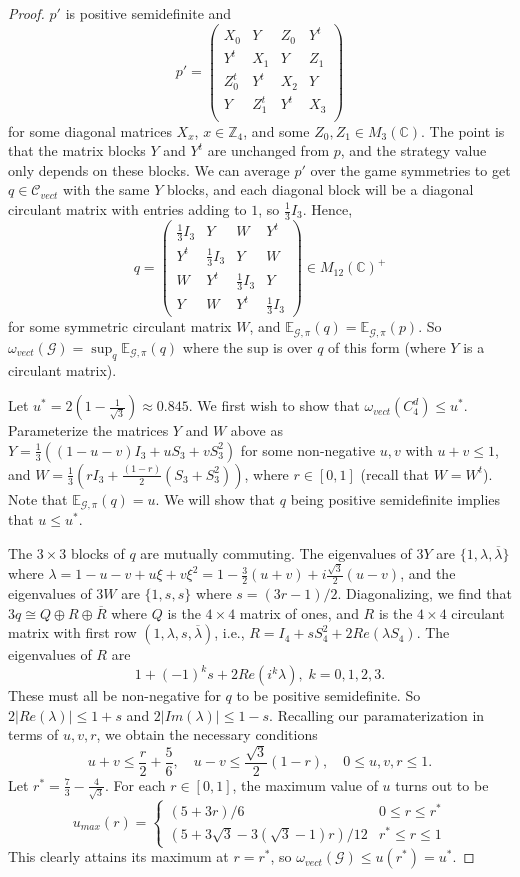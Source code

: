 \documentclass[11pt]{amsart}
\theoremstyle{definition}
\newcommand{\bb}[1]{\mathbb{#1}}
\newcommand{\cl}[1]{\mathcal{#1}}
\begin{document}
\begin{proof}
  $p'$ is positive semidefinite and
  \[ p'
    =
    \begin{pmatrix}
      X_0&Y&Z_0&Y^t\\
      Y^t&X_1&Y&Z_1\\
      Z_0^t&Y^t&X_2&Y\\
      Y&Z_1^t&Y^t&X_3\\
    \end{pmatrix}
  \]
  for some diagonal matrices $X_x$, $x\in \bb Z_4$, and some
  $Z_0,Z_1\in M_3(\bb C)$. The point is that the matrix blocks $Y$ and $Y^t$ are
  unchanged from $p$, and the strategy value only depends on these blocks. We
  can average $p'$ over the game symmetries to get $q\in \cl C_{vect}$ with the
  same $Y$ blocks, and each diagonal block will be a diagonal
  circulant matrix with entries adding to $1$, so $\tfrac13 I_3$. Hence,
  \[ q=
    \begin{pmatrix}
      \tfrac13I_3&Y&W&Y^t\\
      Y^t&\tfrac13I_3&Y&W\\
      W&Y^t&\tfrac13I_3&Y\\
      Y&W&Y^t&\tfrac13I_3
    \end{pmatrix}\in  M_{12}(\bb C)^+\]
  for some symmetric circulant matrix $W$, and $\bb E_{\cl G,\pi}(q)=\bb E_{\cl G,\pi}(p)$. So
  $\omega_{vect}(\cl G)=\sup_q\bb E_{\cl G,\pi}(q)$ where the sup is over $q$ of this form (where $Y$ is a circulant matrix). %

  Let $u^*=2(1-\frac1{\sqrt3})\approx 0.845$. We first wish to show that $\omega_{vect}(C_4^d)\le u^*$.  Parameterize the matrices $Y$ and $W$ above as $Y=\tfrac13((1-u-v)I_3+uS_3+vS_3^2)$ for some non-negative $u,v$ with $u+v\le 1$, and $W=\tfrac13(rI_3+\frac{(1-r)}2(S_3+S_3^2))$, where $r\in [0,1]$ (recall that $W=W^t$). Note that $\bb E_{\cl G,\pi}(q)=u$. We will show that $q$ being positive semidefinite implies that $u\le u^*$.

  The $3\times 3$ blocks of $q$ are mutually commuting. The eigenvalues of $3Y$ are $\{1,\lambda,\overline{\lambda}\}$ where $\lambda=1-u-v+u\xi+v\xi^2=1-\frac32(u+v)+i\frac{\sqrt{3}}2(u-v)$, and the eigenvalues of $3W$ are $\{1,s,s\}$ where $s=(3r-1)/2$. Diagonalizing, we find that $3q\cong Q \oplus R\oplus \overline{R}$ where $Q$ is the $4\times 4$ matrix of ones, and $R$ is the $4\times 4$ circulant matrix with first row $(1,\lambda,s,\overline{\lambda})$, i.e., $R=I_4+sS_4^2+2Re(\lambda S_4)$. The eigenvalues of $R$ are
  \[
    1+(-1)^ks+2Re(i^k\lambda),\; k=0,1,2,3.
  \]
  These must all be non-negative for $q$ to be positive semidefinite.
  So $2|Re(\lambda)|\le 1+s$ and $2|Im(\lambda)|\le 1-s$.
  Recalling our paramaterization in terms of $u,v,r$, we obtain the necessary conditions
  \[ u+v\le \frac r2+\frac56,\quad u-v\le \frac{\sqrt{3}}2(1-r),\quad 0\le u,v,r\le 1.\]
  Let $r^*=\frac73-\frac4{\sqrt3}$. For each $r\in [0,1]$, the maximum value of $u$ turns out to be
  \[
    u_{max}(r)=\begin{cases}
      (5+3 r)/6&0\le r\le r^*\\
      (5+3\sqrt{3}-3(\sqrt{3}-1)r)/12&r^*\le r\le 1
    \end{cases}
  \]
  This clearly attains its maximum at $r=r^*$, so $\omega_{vect}(\mathcal{G})\le u(r^*)=u^*$.


\end{proof}
\end{document}
